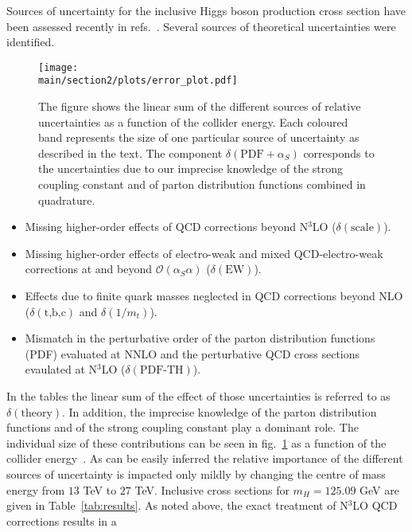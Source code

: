 Sources of uncertainty for the inclusive Higgs boson production cross section have been assessed recently in refs.~\cite{Anastasiou:2016cez,Harlander:2016hcx,Bonvini:2016frm,deFlorian:2016spz}. 
Several sources of theoretical uncertainties were identified.
\begin{figure}[h]
\begin{center}
    \texttt{[image: \\main/section2/plots/error\_plot.pdf]}
    \caption{
    The figure shows the linear sum of the different sources of relative uncertainties as a function of the collider energy. 
    Each coloured band represents the size of one particular source of uncertainty as described in the text.
    The component $\delta(\text{PDF}+\alpha_S)$ corresponds to the uncertainties due to our imprecise knowledge of the strong coupling constant and of parton distribution functions combined in quadrature.
        \label{fig:errorplot}}
        \end{center}
\end{figure}
\begin{itemize}
\item Missing higher-order effects of QCD corrections beyond N$^3$LO ($\delta(\text{scale})$).
\item Missing higher-order effects of electro-weak and mixed QCD-electro-weak corrections at and beyond $\mathcal{O}(\alpha_S \alpha)$ ($\delta(\text{EW})$).
\item Effects due to finite quark masses neglected in QCD corrections beyond NLO  ($\delta(\text{t,b,c})$ and $\delta(1/m_t)$).
\item Mismatch in the perturbative order of the parton distribution functions (PDF) evaluated at NNLO and the perturbative QCD cross sections evaulated at N$^3$LO ($\delta(\text{PDF-TH})$).
\end{itemize}
In the tables the linear sum of the effect of those uncertainties
is referred to as $\delta(\text{theory})$.  In addition, the imprecise
knowledge of the parton distribution functions and of the strong coupling
constant play a dominant role.  The individual size of these
contributions can be seen in fig.~\ref{fig:errorplot} as a function of
the collider energy~\cite{Dulat:2018rbf}.  As can be easily inferred
the relative importance of the different sources of uncertainty is
impacted only mildly by changing the centre of mass energy from $13$
TeV to $27$ TeV.  Inclusive cross sections for
$m_H=125.09$ GeV are given in Table~\ref{tab:results}. As noted above, the
exact treatment of N$^3$LO QCD corrections results in a
